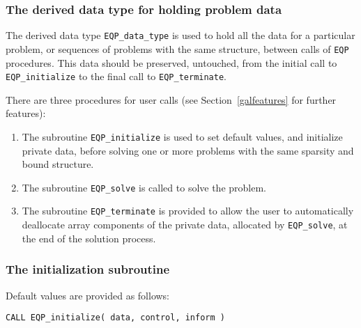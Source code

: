 \documentclass{galahad}
\newcommand{\packagename}{EQP}
\begin{document}



\subsubsection{The derived data type for holding problem data}\label{typedata}
The derived data type 
{\tt \packagename\_data\_type} 
is used to hold all the data for a particular problem,
or sequences of problems with the same structure, between calls of 
{\tt \packagename} procedures. 
This data should be preserved, untouched, from the initial call to 
{\tt \packagename\_initialize}
to the final call to
{\tt \packagename\_terminate}.


\galarguments
There are three procedures for user calls
(see Section~\ref{galfeatures} for further features): 

\begin{enumerate}
\item The subroutine 
      {\tt \packagename\_initialize} 
      is used to set default values, and initialize private data, 
      before solving one or more problems with the
      same sparsity and bound structure.
\item The subroutine 
      {\tt \packagename\_solve} 
      is called to solve the problem.
\item The subroutine 
      {\tt \packagename\_terminate} 
      is provided to allow the user to automatically deallocate array 
       components of the private data, allocated by 
       {\tt \packagename\_solve}, 
       at the end of the solution process. 
\end{enumerate}


\subsubsection{The initialization subroutine}\label{subinit}
 Default values are provided as follows:
\vspace*{1mm}

\hspace{8mm}
{\tt CALL \packagename\_initialize( data, control, inform )}
\end{document}
